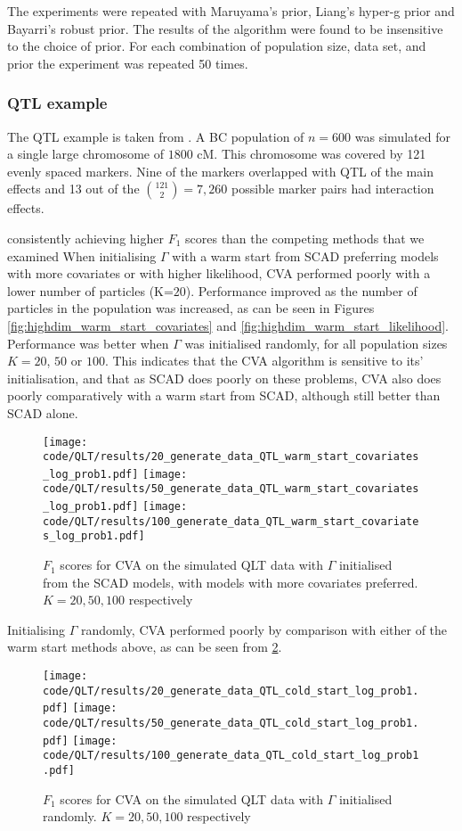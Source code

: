 \documentclass{amsart}[12pt]
\begin{document}
The experiments were repeated with Maruyama's prior, Liang's hyper-g prior and Bayarri's robust prior.
The results of the algorithm were found to be insensitive to the choice of prior.
For each combination of population size, data set, and prior the experiment was repeated 50 times.

\subsubsection{QTL example}
The QTL example is taken from \cite{Xu2007}. A BC population of $n=600$ was simulated for a single large
chromosome of $1800$ cM. This chromosome was covered by 121 evenly spaced markers. Nine of the markers
overlapped with QTL of the main effects and 13 out of the $\binom{121} 2 = 7,260$ possible marker pairs had
interaction effects.

consistently achieving higher $F_1$ scores than the competing methods that we examined
When initialising $\Gamma$ with a warm start from SCAD preferring models with more covariates or with higher
likelihood, CVA performed poorly with a lower number of particles (K=$20$). Performance improved as the number
of particles in the population was increased, as can be seen in Figures
\ref{fig:highdim_warm_start_covariates} and \ref{fig:highdim_warm_start_likelihood}. Performance was better
when $\Gamma$ was initialised randomly, for all population sizes $K=20$, $50$ or $100$. This indicates that
the CVA algorithm is sensitive to its' initialisation, and that as SCAD does poorly on these problems, CVA
also does poorly comparatively with a warm start from SCAD, although still better than SCAD alone.

\begin{figure}\label{fig:QLT_warm_start_covariates}
\caption{$F_1$ scores for CVA on the simulated QLT data with $\Gamma$ initialised from the SCAD models, with
models with more covariates preferred. $K=20, 50, 100$ respectively}
\texttt{[image: code/QLT/results/20\_generate\_data\_QTL\_warm\_start\_covariates\_log\_prob1.pdf]}
\texttt{[image: code/QLT/results/50\_generate\_data\_QTL\_warm\_start\_covariates\_log\_prob1.pdf]}
\texttt{[image: code/QLT/results/100\_generate\_data\_QTL\_warm\_start\_covariates\_log\_prob1.pdf]}
\end{figure}

Initialising $\Gamma$ randomly, CVA performed poorly by comparison with either of the warm start methods
above, as can be seen from \ref{fig:QLT_cold_start}.
\begin{figure}\label{fig:QLT_cold_start}
\caption{$F_1$ scores for CVA on the simulated QLT data with $\Gamma$ initialised randomly. $K=20, 50, 100$ respectively}
\texttt{[image: code/QLT/results/20\_generate\_data\_QTL\_cold\_start\_log\_prob1.pdf]}
\texttt{[image: code/QLT/results/50\_generate\_data\_QTL\_cold\_start\_log\_prob1.pdf]}
\texttt{[image: code/QLT/results/100\_generate\_data\_QTL\_cold\_start\_log\_prob1.pdf]}
\end{figure}
\end{document}
